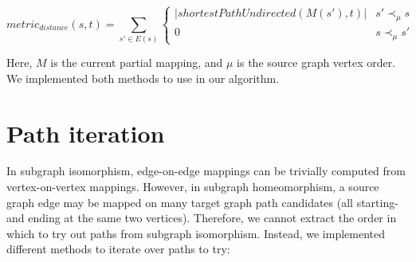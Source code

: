 $$\mathit{metric}_\mathit{distance}(s, t)=\sum_{s' \in E(s)} \begin{cases}
|\mathit{shortestPathUndirected}(M(s'), t)| & s' \prec_\mu s\\
0 & s \prec_\mu s'
\end{cases}$$

Here, $M$ is the current partial mapping, and $\mu$ is the source graph vertex order. We implemented both methods to use in our algorithm.

\section{Path iteration}
\label{sec:pathIterationShort}
In subgraph isomorphism, edge-on-edge mappings can be trivially computed from vertex-on-vertex mappings. However, in subgraph homeomorphism, a source graph edge may be mapped on many target graph path candidates (all starting- and ending at the same two vertices). Therefore, we cannot extract the order in which to try out paths from subgraph isomorphism. Instead, we implemented different methods to iterate over paths to try:

